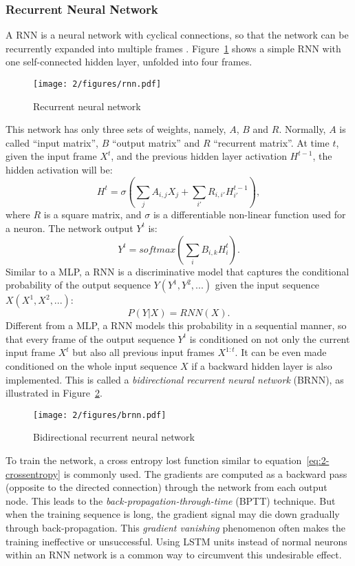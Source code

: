 \subsubsection{Recurrent Neural Network}
A RNN is a neural network with cyclical connections, so that the network can be recurrently expanded into multiple frames \cite{elman1990finding,jordan1986attractor,lang1990time}. Figure~\ref{fig:2-rnn} shows a simple RNN with one self-connected hidden layer, unfolded into four frames.
\begin{figure}[htb]
\centering
\texttt{[image: 2/figures/rnn.pdf]}
\caption{Recurrent neural network}
\label{fig:2-rnn}
\end{figure}
This network has only three sets of weights, namely, $A$, $B$ and $R$. Normally, $A$ is called ``input matrix'', $B$ ``output matrix'' and $R$ ``recurrent matrix''. At time $t$, given the input frame $X^t$, and the previous hidden layer activation $H^{t-1}$, the hidden activation will be:
\begin{equation}
H^t = \sigma(\sum_j A_{i,j}X_j + \sum_{i'} R_{i,i'}H^{t-1}_{i'}),
\end{equation}
where $R$ is a square matrix, and $\sigma$ is a differentiable non-linear function used for a neuron. The network output $Y^t$ is:
\begin{equation}
Y^t = softmax(\sum_i B_{i,k}H^t_i).
\end{equation}
Similar to a MLP, a RNN is a discriminative model that captures the conditional probability of the output sequence $Y (Y^1,Y^2,...)$ given the input sequence $X (X^1, X^2,...)$:
\begin{equation}
P(Y|X) = RNN(X).
\end{equation}
Different from a MLP, a RNN models this probability in a sequential manner, so that every frame of the output sequence $Y^t$ is conditioned on not only the current input frame $X^t$ but also all previous input frames $X^{1:t}$. It can be even made conditioned on the whole input sequence $X$ if a backward hidden layer is also implemented. This is called a {\it bidirectional recurrent neural network} (BRNN), as illustrated in Figure~\ref{fig:2-brnn}.
\begin{figure}[htb]
\centering
\texttt{[image: 2/figures/brnn.pdf]}
\caption{Bidirectional recurrent neural network}
\label{fig:2-brnn}
\end{figure}

To train the network, a cross entropy lost function similar to equation~\ref{eq:2-crossentropy} is commonly used. The gradients are computed as a backward pass (opposite to the directed connection) through the network from each output node. This leads to the {\it back-propagation-through-time} (BPTT) \cite{rumelhart1988parallel,werbos1990backpropagation} technique. But when the training sequence is long, the gradient signal may die down gradually through back-propagation. This {\it gradient vanishing} \cite{bengio2009learning} phenomenon often makes the training ineffective or unsuccessful. Using LSTM units instead of normal neurons within an RNN network is a common way to circumvent this undesirable effect.

